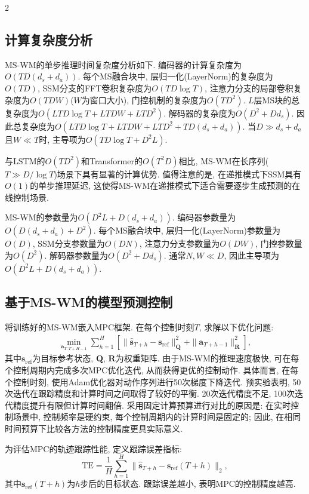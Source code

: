 \begin{multicols}{2}
\subsection{计算复杂度分析}

MS-WM的单步推理时间复杂度分析如下.
编码器的计算复杂度为$O(TD(d_s+d_a))$.
每个MS融合块中, 层归一化(LayerNorm)的复杂度为$O(TD)$,
SSM分支的FFT卷积复杂度为$O(TD\log T)$,
注意力分支的局部卷积复杂度为$O(TDW)$($W$为窗口大小),
门控机制的复杂度为$O(TD^2)$.
$L$层MS块的总复杂度为$O(LTD\log T + LTDW + LTD^2)$.
解码器的复杂度为$O(D^2 + Dd_s)$.
因此总复杂度为$O(LTD\log T + LTDW + LTD^2 + TD(d_s+d_a))$.
当$D \gg d_s + d_a$且$W \ll T$时, 主导项为$O(TD\log T + D^2L)$.

与LSTM的$O(TD^2)$和Transformer的$O(T^2D)$相比,
MS-WM在长序列($T \gg D/\log T$)场景下具有显著的计算优势.
值得注意的是, 在递推模式下SSM具有$O(1)$的单步推理延迟,
这使得MS-WM在递推模式下适合需要逐步生成预测的在线控制场景.

MS-WM的参数量为$O(D^2L + D(d_s+d_a))$.
编码器参数量为$O(D(d_s+d_a) + D^2)$.
每个MS融合块中, 层归一化(LayerNorm)参数量为$O(D)$,
SSM分支参数量为$O(DN)$,
注意力分支参数量为$O(DW)$,
门控参数量为$O(D^2)$.
解码器参数量为$O(D^2 + Dd_s)$.
通常$N, W \ll D$, 因此主导项为$O(D^2L + D(d_s+d_a))$.

\subsection{基于MS-WM的模型预测控制}

将训练好的MS-WM嵌入MPC框架. 在每个控制时刻$T$,
求解以下优化问题:
\begin{eqnarray}
\min_{{\bm a}_{T:T+H-1}} \sum_{h=1}^{H}\left[\|\hat{{\bm s}}_{T+h} - {\bm s}_{\text{ref}}\|_{{\bm Q}}^2
+ \|{\bm a}_{T+h-1}\|_{{\bm R}}^2\right],
\end{eqnarray}
其中${\bm s}_{\text{ref}}$为目标参考状态, ${\bm Q}$, ${\bm R}$为权重矩阵.
由于MS-WM的推理速度极快, 可在每个控制周期内完成多次MPC优化迭代,
从而获得更优的控制动作.
具体而言, 在每个控制时刻, 使用Adam优化器对动作序列进行50次梯度下降迭代. 预实验表明, 50次迭代在跟踪精度和计算时间之间取得了较好的平衡. 20次迭代精度不足, 100次迭代精度提升有限但计算时间翻倍.
采用固定计算预算进行对比的原因是: 在实时控制场景中, 控制频率是硬约束, 每个控制周期内的计算时间是固定的; 因此, 在相同时间预算下比较各方法的控制精度更具实际意义.

为评估MPC的轨迹跟踪性能, 定义跟踪误差指标:
\begin{equation}
\text{TE} = \frac{1}{H}\sum_{h=1}^{H}\|\hat{{\bm s}}_{T+h} - {\bm s}_{\text{ref}}(T+h)\|_2,
\end{equation}
其中${\bm s}_{\text{ref}}(T+h)$为$h$步后的目标状态. 跟踪误差越小, 表明MPC的控制精度越高.


\end{multicols}
